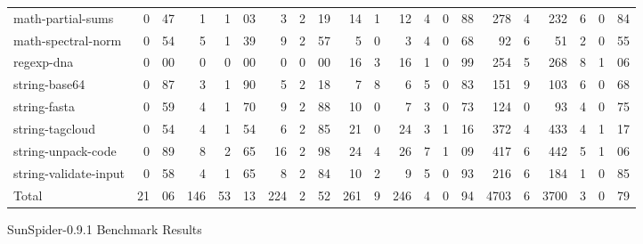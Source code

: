 \begin{figure*}
\begin{center}
\begin{tabular}{lr@{.}lrr@{.}lrr@{.}lr@{.}lr@{.}lr@{.}lr@{.}lr@{.}lr@{.}l}
math-partial-sums        & 0&47 & 1   & 1&03 & 3  & 2&19
    & 14&1 & 12&4 & 0&88  & 278&4 & 232&6 & 0&84 \\
math-spectral-norm       & 0&54 & 5   & 1&39 & 9  & 2&57
    & 5&0  & 3&4 & 0&68   & 92&6  & 51&2  & 0&55 \\
regexp-dna               & 0&00 & 0   & 0&00 & 0    & 0&00
    & 16&3 & 16&1 & 0&99  & 254&5 & 268&8 & 1&06 \\
string-base64            & 0&87 & 3   & 1&90 & 5   & 2&18
    & 7&8  & 6&5 & 0&83   & 151&9 & 103&6 & 0&68 \\
string-fasta             & 0&59 & 4   & 1&70 & 9   & 2&88
    & 10&0 & 7&3 & 0&73   & 124&0 & 93&4  & 0&75 \\
string-tagcloud          & 0&54 & 4   & 1&54 & 6  & 2&85
    & 21&0 & 24&3 & 1&16 & 372&4 & 433&4 & 1&17 \\
string-unpack-code       & 0&89 & 8   & 2&65 & 16 & 2&98
    & 24&4 & 26&7 & 1&09 & 417&6 & 442&5 & 1&06 \\
string-validate-input    & 0&58 & 4   & 1&65 & 8  & 2&84
    & 10&2 & 9&5 & 0&93   & 216&6 & 184&1 & 0&85 \\

\midrule

Total                  & 21&06 & 146 & 53&13 & 224 & 2&52
    & 261&9 & 246&4 & 0&94 & 4703&6 & 3700&3 & 0&79 \\

\bottomrule

\end{tabular}
\end{center}
\nocaptionrule \caption{SunSpider-0.9.1 Benchmark Results}
\end{figure*}

